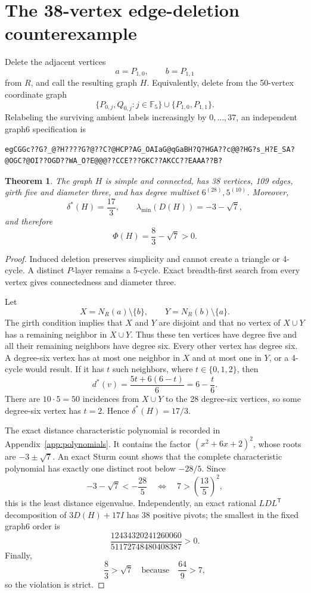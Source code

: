 \documentclass[11pt,reqno]{amsart}
\newcommand{\F}{\mathbb F_5}
\newcommand{\PhiScore}{\Phi}
\theoremstyle{plain}
\newtheorem{theorem}{Theorem}[section]
\theoremstyle{definition}
\theoremstyle{remark}
\begin{document}
\section{The 38-vertex edge-deletion counterexample}

Delete the adjacent vertices
\[
 a=P_{1,0},\qquad b=P_{1,1}
\]
from $R$, and call the resulting graph $H$.  Equivalently, delete from the
50-vertex coordinate graph
\[
 \{P_{0,j},Q_{0,j}:j\in\F\}\cup\{P_{1,0},P_{1,1}\}.
\]
Relabeling the surviving ambient labels increasingly by $0,\ldots,37$, an
independent graph6 specification is
\begin{verbatim}
egCGGc??G?_@?H????G?@??C?@HCP?AG_OAIaG@qGaBH?Q?HGA??c@@?HG?s_H?E_SA?
@OGC?@OI??OGD??WA_O?E@@@??CCE???GKC??AKCC??EAAA??B?
\end{verbatim}

\begin{theorem}\label{thm:H38}
The graph $H$ is simple and connected, has 38 vertices, 109 edges, girth five
and diameter three, and has degree multiset $6^{(28)},5^{(10)}$.  Moreover,
\[
 \delta^*(H)=\frac{17}{3},
 \qquad
 \lambda_{\min}(D(H))=-3-\sqrt7,
\]
and therefore
\[
 \PhiScore(H)=\frac83-\sqrt7>0.
\]
\end{theorem}

\begin{proof}
Induced deletion preserves simplicity and cannot create a triangle or
4-cycle.  A distinct $P$-layer remains a 5-cycle.  Exact breadth-first search
from every vertex gives connectedness and diameter three.

Let
\[
 X=N_R(a)\setminus\{b\},\qquad
 Y=N_R(b)\setminus\{a\}.
\]
The girth condition implies that $X$ and $Y$ are disjoint and that no vertex
of $X\cup Y$ has a remaining neighbor in $X\cup Y$.  Thus these ten vertices
have degree five and all their remaining neighbors have degree six.  Every
other vertex has degree six.  A degree-six vertex has at most one neighbor in
$X$ and at most one in $Y$, or a 4-cycle would result.  If it has $t$ such
neighbors, where $t\in\{0,1,2\}$, then
\[
 d^*(v)=\frac{5t+6(6-t)}6=6-\frac{t}{6}.
\]
There are $10\cdot5=50$ incidences from $X\cup Y$ to the 28 degree-six
vertices, so some degree-six vertex has $t=2$.  Hence
$\delta^*(H)=17/3$.

The exact distance characteristic polynomial is recorded in
Appendix~\ref{app:polynomials}.  It contains the factor
$(x^2+6x+2)^2$, whose roots are $-3\pm\sqrt7$.  An exact Sturm count shows
that the complete characteristic polynomial has exactly one distinct root
below $-28/5$.  Since
\[
 -3-\sqrt7<-\frac{28}{5}
 \quad\Longleftrightarrow\quad
 7>\left(\frac{13}{5}\right)^2,
\]
this is the least distance eigenvalue.  Independently, an exact rational
$LDL^{\mathsf T}$ decomposition of $3D(H)+17I$ has 38 positive pivots; the
smallest in the fixed graph6 order is
\[
 \frac{12434320241260060}{51172748480408387}>0.
\]
Finally,
\[
 \frac83>\sqrt7
 \quad\text{because}\quad
 \frac{64}{9}>7,
\]
so the violation is strict.
\end{proof}
\end{document}

